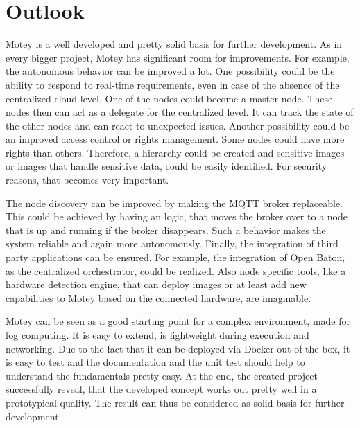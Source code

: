 



\section{Outlook}
Motey is a well developed and pretty solid basis for further development.
As in every bigger project, Motey has significant room for improvements.
For example, the autonomous behavior can be improved a lot.
One possibility could be the ability to respond to real-time requirements, even in case of the absence of the centralized cloud level.
One of the nodes could become a master node.
These nodes then can act as a delegate for the centralized level.
It can track the state of the other nodes and can react to unexpected issues.
Another possibility could be an improved access control or rights management.
Some nodes could have more rights than others.
Therefore, a hierarchy could be created and sensitive images or images that handle sensitive data, could be easily identified.
For security reasons, that becomes very important.\newline

The node discovery can be improved by making the \ac{MQTT} broker replaceable.
This could be achieved by having an logic, that moves the broker over to a node that is up and running if the broker disappears.
Such a behavior makes the system reliable and again more autonomously.
Finally, the integration of third party applications can be ensured.
For example, the integration of Open Baton, as the centralized orchestrator, could be realized.
Also node specific tools, like a hardware detection engine, that can deploy images or at least add new capabilities to Motey based on the connected hardware, are imaginable.\newline

Motey can be seen as a good starting point for a complex environment, made for fog computing.
It is easy to extend, is lightweight during execution and networking.
Due to the fact that it can be deployed via Docker out of the box, it is easy to test and the documentation and the unit test should help to understand the fundamentals pretty easy.
At the end, the created project successfully reveal, that the developed concept works out pretty well in a prototypical quality.
The result can thus be considered as solid basis for further development.
